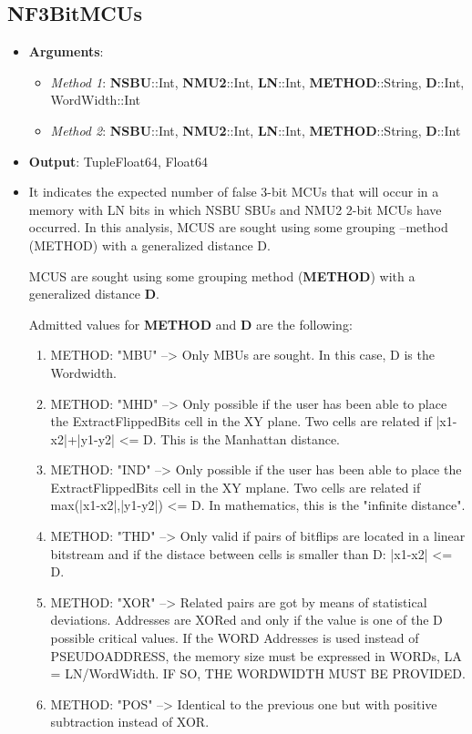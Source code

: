 \subsection*{NF3BitMCUs}
%
\begin{itemize}
	\item \textbf{Arguments}: 
	\begin{itemize}
		\item \textit{Method 1}: \textbf{NSBU}::Int, \textbf{NMU2}::Int, \textbf{LN}::Int, \textbf{METHOD}::String, \textbf{D}::Int, WordWidth::Int
		\item \textit{Method 2}: \textbf{NSBU}::Int, \textbf{NMU2}::Int, \textbf{LN}::Int, \textbf{METHOD}::String, \textbf{D}::Int
	\end{itemize}
	\item \textbf{Output}: Tuple{Float64, Float64}
	\item     It indicates the expected number of false 3-bit MCUs that will occur 
	 in a memory with LN bits in which NSBU SBUs and NMU2 2-bit MCUs have occurred. 
	 In this analysis, MCUS are sought using some grouping --method (METHOD) with a generalized 
	 distance D.
	
	MCUS are sought using some grouping method (\textbf{METHOD}) with a generalized distance \textbf{D}.
	
	Admitted values for \textbf{METHOD} and \textbf{D} are the following:
	
	\begin{enumerate}
		\item METHOD: "MBU" --> Only MBUs are sought. In this case, D is the Wordwidth.
		\item METHOD: "MHD" --> Only possible if the user has been able to place the ExtractFlippedBits 	 	cell in the XY plane. Two cells are related if |x1-x2|+|y1-y2| <= D. This 
		is the Manhattan distance.
		\item METHOD: "IND" --> Only possible if the user has been able to place the ExtractFlippedBits
		cell in the XY mplane. Two cells are related if max(|x1-x2|,|y1-y2|) <= D.
		In mathematics, this is the "infinite distance".
		\item METHOD: "THD" --> Only valid if pairs of bitflips are located in a linear bitstream and if the
		distace between cells is smaller than D: |x1-x2| <= D.
		\item METHOD: "XOR" --> Related pairs are got by means of statistical deviations. Addresses are XORed 
		and only if the value is one of the D possible critical values. If the WORD Addresses  
		is used instead of PSEUDOADDRESS, the memory size must be expressed in WORDs, 
		LA = LN/WordWidth.
		IF SO, THE WORDWIDTH MUST BE PROVIDED.
		\item METHOD: "POS" --> Identical to the previous one but with positive subtraction instead of XOR.
	\end{enumerate}
	

\end{itemize}
